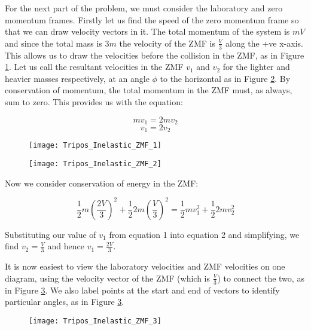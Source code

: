 \begin{problem}
{For the next part of the problem, we must consider the laboratory and zero momentum frames. Firstly let us find the speed of the zero momentum frame so that we can draw velocity vectors in it. The total momentum of the system is $mV$ and since the total mass is $3m$ the velocity of the ZMF is $\frac{V}{3}$ along the +ve x-axis. This allows us to draw the velocities before the collision in the ZMF, as in Figure \ref{fig:Tripos_Inelastic_ZMF_1}. Let us call the resultant velocities in the ZMF $v_1$ and $v_2$ for the lighter and heavier masses respectively, at an angle $\phi$ to the horizontal as in Figure \ref{fig:Tripos_Inelastic_ZMF_2}. By conservation of momentum, the total momentum in the ZMF must, as always, sum to zero. This provides us with the equation:

\begin{equation*}mv_1=2mv_2\end{equation*}
\begin{equation}v_1=2v_2\end{equation}


\begin{figure}[h]
	\centering
	\texttt{[image: Tripos\_Inelastic\_ZMF\_1]}
	\caption{}
	\label{fig:Tripos_Inelastic_ZMF_1}
\end{figure}

\begin{figure}[h]
	\centering
	\texttt{[image: Tripos\_Inelastic\_ZMF\_2]}
	\caption{}
	\label{fig:Tripos_Inelastic_ZMF_2}
\end{figure}


Now we consider conservation of energy in the ZMF:

\begin{equation}\frac{1}{2}m\left(\frac{2V}{3}\right)^2+\frac{1}{2}2m\left(\frac{V}{3}\right)^2=\frac{1}{2}mv_1^2+\frac{1}{2}2mv_2^2\end{equation}

Substituting our value of $v_1$ from equation 1 into equation 2 and simplifying, we find $v_2=\frac{V}{3}$ and hence $v_1=\frac{2V}{3}$. 

It is now easiest to view the laboratory velocities and ZMF velocities on one diagram, using the velocity vector of the ZMF (which is $\frac{V}{3}$) to connect the two, as in Figure \ref{fig:Tripos_Inelastic_ZMF_3}. We also label points at the start and end of vectors to identify particular angles, as in Figure \ref{fig:Tripos_Inelastic_ZMF_3}. 


\begin{figure}[h]
	\centering
	\texttt{[image: Tripos\_Inelastic\_ZMF\_3]}
	\caption{}
	\label{fig:Tripos_Inelastic_ZMF_3}
\end{figure}

}
\end{problem}
